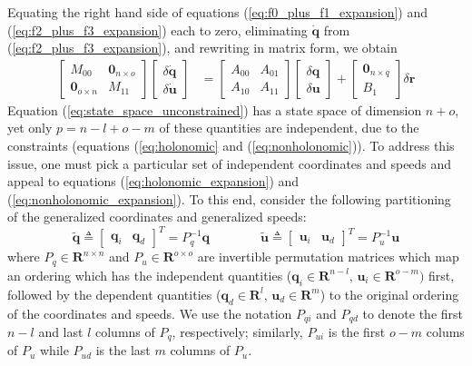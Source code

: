 \documentclass{svjour3}                     %
\begin{document}
Equating the right hand side of equations (\ref{eq:f0_plus_f1_expansion}) and
(\ref{eq:f2_plus_f3_expansion}) each to zero, eliminating $\bm{\dot{q}}$ from
(\ref{eq:f2_plus_f3_expansion}), and rewriting in matrix form, we obtain
\begin{align}
  \label{eq:state_space_unconstrained}
  \left[
    \begin{array}{cc}
      M_{00} & \bm{0}_{n \times o} \\
      \bm{0}_{o \times n} & M_{11}
    \end{array}
    \right]
    \left[
      \begin{array}{c}
        \delta \bm{\dot{q}} \\
        \delta \bm{\dot{u}}
      \end{array}
    \right]
   &=
   \left[
     \begin{array}{cc}
       A_{00} & A_{01} \\
       A_{10} & A_{11}
     \end{array}
   \right]
    \left[
      \begin{array}{c}
        \delta \bm{q} \\
        \delta \bm{u}
      \end{array}
    \right]
    +
    \left[
      \begin{array}{c}
        \bm{0}_{n \times q} \\
        B_{1}
      \end{array}
    \right]
    \delta \bm{r}
\end{align}
Equation (\ref{eq:state_space_unconstrained}) has a state space of dimension $n
+ o$, yet  only $p = n - l + o - m$ of these quantities are independent, due to
the constraints (equations (\ref{eq:holonomic} and (\ref{eq:nonholonomic})).
To address this issue, one must pick a particular set of independent
coordinates and speeds and appeal to equations (\ref{eq:holonomic_expansion})
and (\ref{eq:nonholonomic_expansion}).  To this end, consider the following
partitioning of the generalized coordinates and generalized speeds:
\begin{equation*}
  \tilde{\bm{q}} \triangleq \left[\begin{array}{cc}\bm{q}_{i} &
      \bm{q}_{d}\end{array}\right]^{T} =  P_{q}^{-1} \bm{q}
      \qquad\qquad
  \tilde{\bm{u}} \triangleq \left[\begin{array}{cc}\bm{u}_{i} &
      \bm{u}_{d}\end{array}\right]^{T} =  P_{u}^{-1} \bm{u}
\end{equation*}
where $P_q \in \mathbf{R}^{n \times n}$ and $P_u \in \mathbf{R}^{o \times o}$
are invertible permutation matrices which map an ordering which has the
independent quantities ($\bm{q}_{i}\in\mathbf{R}^{n-l},\,
\bm{u}_{i}\in\mathbf{R}^{o-m})$ first, followed by the dependent quantities
($\bm{q}_{d}\in\mathbf{R}^{l},\, \bm{u}_{d}\in\mathbf{R}^{m}$) to the
original ordering of the coordinates and speeds.  We use the notation $P_{qi}$
and $P_{qd}$ to denote the first $n-l$ and last $l$ columns of $P_q$,
respectively; similarly, $P_{ui}$ is the first $o-m$ colums of $P_{u}$ while
$P_{ud}$ is the last $m$ columns of $P_u$.
\end{document}
